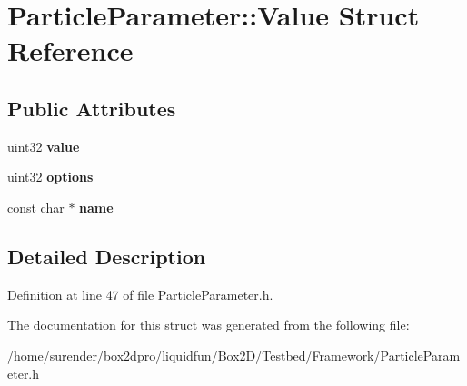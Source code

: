 \hypertarget{structParticleParameter_1_1Value}{\section{Particle\-Parameter\-:\-:Value Struct Reference}
\label{structParticleParameter_1_1Value}
}
\subsection*{Public Attributes}
\begin{DoxyCompactItemize}
\item 
\hypertarget{structParticleParameter_1_1Value_ab3607868d2ce718f5a6b47646fc6e0a2}{uint32 {\bfseries value}}\label{structParticleParameter_1_1Value_ab3607868d2ce718f5a6b47646fc6e0a2}

\item 
\hypertarget{structParticleParameter_1_1Value_aaa6b4bc2e6e6c6c3d9ffbc122b9e7cd6}{uint32 {\bfseries options}}\label{structParticleParameter_1_1Value_aaa6b4bc2e6e6c6c3d9ffbc122b9e7cd6}

\item 
\hypertarget{structParticleParameter_1_1Value_a61e8d33680acce61cced2ab0d5e91d4e}{const char $\ast$ {\bfseries name}}\label{structParticleParameter_1_1Value_a61e8d33680acce61cced2ab0d5e91d4e}

\end{DoxyCompactItemize}


\subsection{Detailed Description}


Definition at line 47 of file Particle\-Parameter.\-h.



The documentation for this struct was generated from the following file\-:\begin{DoxyCompactItemize}
\item 
/home/surender/box2dpro/liquidfun/\-Box2\-D/\-Testbed/\-Framework/Particle\-Parameter.\-h\end{DoxyCompactItemize}
